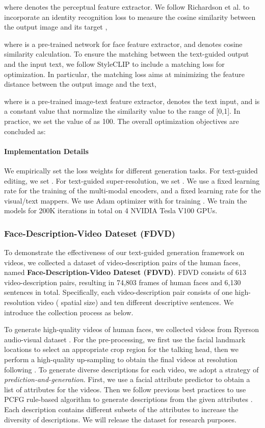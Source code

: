 where  denotes the perceptual feature extractor.
We follow Richardson et al. to incorporate an identity recognition loss to measure the cosine similarity between the output image and its target \cite{richardson2021psp},

where  is a pre-trained network for face feature extractor, and  denotes cosine similarity calculation. To ensure the matching between the text-guided output and the input text, we follow StyleCLIP \cite{patashnik2021styleclip} to include a matching loss for optimization. In particular, the matching loss aims at minimizing the feature distance between the output image and the text,

where  is a pre-trained image-text feature extractor,   denotes the text input, and  is a constant value that normalize the similarity value to the range of [0,1]. In practice, we set the value of  as 100.
The overall optimization objectives are concluded as:

\paragraph{Implementation Details}
We empirically set the loss weights for different generation tasks. For text-guided editing, we set . For text-guided super-resolution, we set . We use a fixed learning rate  for the training of the multi-modal encoders, and a fixed learning rate  for the visual/text mappers. We use Adam optimizer with  for training \cite{kingma2014adam}. We train the models for 200K iterations in total on 4 NVIDIA Tesla V100 GPUs.

\subsubsection{Face-Description-Video Dateset (FDVD)}
\label{sec:fdvd}
To demonstrate the effectiveness of our text-guided generation framework on videos, we collected a dataset of video-description pairs of the human faces, named \textbf{Face-Description-Video Dateset (FDVD)}. FDVD consists of 613 video-description pairs, resulting in 74,803 frames of human faces and 6,130 sentences in total. Specifically, each video-description pair consists of one high-resolution video ( spatial size) and ten different descriptive sentences. We introduce the collection process as below.

To generate high-quality videos of human faces, we collected videos from Ryerson audio-visual dataset \cite{livingstone2018ryerson}. For the pre-processing, we first use the facial landmark locations to select an appropriate crop region for the talking head, then we perform a high-quality up-sampling to obtain the final videos at  resolution following \cite{karras2018progressive}. 
To generate diverse descriptions for each video, we adopt a strategy of \textit{prediction-and-generation}. First, we use a facial attribute predictor \cite{liu2015faceattributes} to obtain a list of attributes for the videos. Then we follow previous best practices to use PCFG rule-based algorithm to generate descriptions from the given attributes \cite{xia2021tedigan,stap2020conditional}. Each description contains different subsets of the attributes to increase the diversity of descriptions. We will release the dataset for research purposes.


